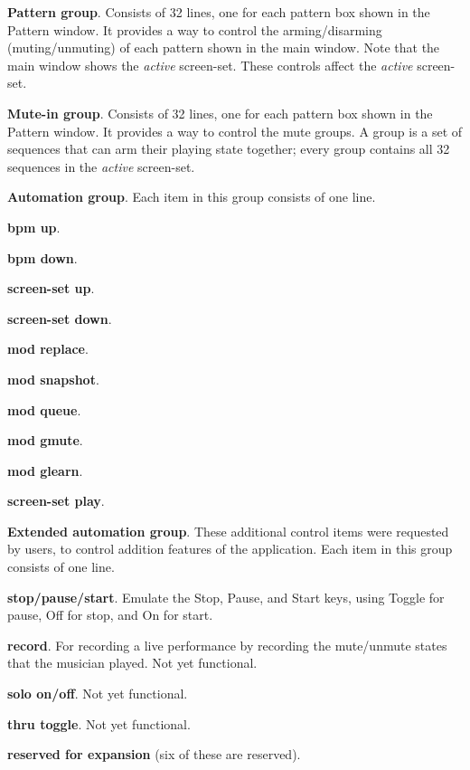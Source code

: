    \begin{enumber}
      \item \textbf{Pattern group}.
         Consists of 32 lines, one for each
         pattern box shown in the Pattern window.
         It provides a way to control the arming/disarming (muting/unmuting) of
         each pattern shown in the main window.  Note that the
         main window shows the \textsl{active} screen-set.  These controls affect
         the \textsl{active} screen-set.
      \item \textbf{Mute-in group}.
         Consists of 32 lines, one for each
         pattern box shown in the Pattern window.
         It provides a way to control the mute groups.
         A group is a set of sequences that can arm their playing state
         together; every group contains all 32 sequences in the
         \textsl{active} screen-set.
      \item \textbf{Automation group}.
         Each item in this group consists of one line.
         \begin{enumber}
            \item \textbf{bpm up}.
            \item \textbf{bpm down}.
            \item \textbf{screen-set up}.
            \item \textbf{screen-set down}.
            \item \textbf{mod replace}.
            \item \textbf{mod snapshot}.
            \item \textbf{mod queue}.
            \item \textbf{mod gmute}.
            \item \textbf{mod glearn}.
            \item \textbf{screen-set play}.
         \end{enumber}
      \item \textbf{Extended automation group}.
         These additional control items were requested by users, to control
         addition features of the application.
         Each item in this group consists of one line.
         \begin{enumber}
            \item \textbf{stop/pause/start}.  Emulate the Stop, Pause, and
               Start keys, using Toggle for pause, Off for stop, and On for
               start.
            \item \textbf{record}.  For recording a live performance by
               recording the mute/unmute states that the musician played.
               Not yet functional.
            \item \textbf{solo on/off}.
               Not yet functional.
            \item \textbf{thru toggle}.
               Not yet functional.
            \item \textbf{reserved for expansion} (six of these are reserved).
         \end{enumber}
   \end{enumber}

